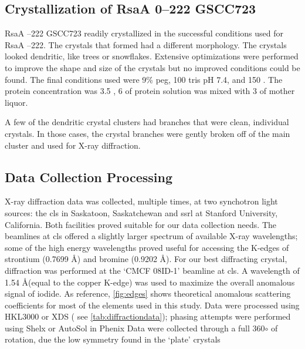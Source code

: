 \subsection{Crystallization of RsaA \del{}0--222 GSCC723} \label{sec:cryst-rsaa-del0}

RsaA --222 GSCC723 readily crystallized in the successful conditions used for RsaA --222. The crystals that formed had a different morphology. The crystals looked dendritic, like trees or snowflakes. Extensive optimizations were performed to improve the shape and size of the crystals but no improved conditions could be found. The final conditions used were 9\% \ac{peg}, 100 \millimolar{} tris pH 7.4, and 150 \millimolar{} . The protein concentration was 3.5 \mgperml{}, 6 \microlitre{} of protein solution was mixed with 3 \microlitre{} of mother liquor. 

A few of the dendritic crystal clusters had branches that were clean, individual crystals. In those cases, the crystal branches were gently broken off of the main cluster and used for X-ray diffraction.


\subsection{Data Collection Processing}\label{sec:crystal-data-collection}
X-ray diffraction data was collected, multiple times, at two synchotron light
sources: the \ac{cls} in Saskatoon, Saskatchewan and \ac{ssrl} at Stanford
University, California. Both facilities proved suitable for our data collection
needs. The beamlines at \ac{cls} offered a slightly larger spectrum of available
X-ray wavelengths; some of the high energy wavelengths proved useful for
accessing the K-edges of strontium (0.7699 \AA) and bromine (0.9202 \AA). For
our best diffracting crystal, diffraction was performed at the `CMCF 08ID-1'
beamline at \ac{cls}. A wavelength of 1.54 \AA (equal to the copper K-edge) was
used to maximize the overall anomalous signal of iodide.  As
reference, \cref{fig:edges} shows theoretical anomalous scattering coefficients
for most of the elements used in this study. Data were processed using
HKL3000 or XDS ( see
\cref{tab:diffractiondata}); phasing attempts were performed using
Shelx or AutoSol in
Phenix Data were collected through a full
360$\circ$ of rotation, due the low symmetry found in the `plate' crystals


